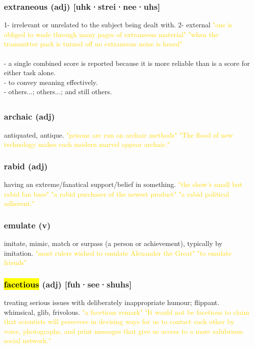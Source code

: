 \documentclass{proc}
\begin{document}
	\subsubsection{\textcolor{brickred}{extraneous} (adj) [uhk·strei·nee·uhs]}
	1- irrelevant or unrelated to the subject being dealt with.
	2- external
	\textcolor{gold}{"one is obliged to wade through many pages of extraneous material" "when the transmitter pack is turned off no extraneous noise is heard"}\\\\
	- a single combined score is reported because it is more reliable than is a score for either task alone.\\
	- to convey meaning effectively.\\
	- others...; others...; and still others.
	
	\newpage
	\subsection{}
	\subsubsection{\textcolor{brickred}{archaic} (adj)}
	antiquated, antique.
	\textcolor{gold}{"prisons are run on archaic methods" "The flood  of  new  technology makes each  modern marvel appear archaic."}
	
	\subsubsection{\textcolor{brickred}{rabid} (adj)}
	having an extreme/fanatical support/belief in something.
	\textcolor{gold}{"the show's small but rabid fan base" "a rabid purchaser of the newest product" "a rabid political adherent."}
	
	\subsubsection{\textcolor{brickred}{emulate} (v)}
	imitate, mimic, match or surpass (a person or achievement), typically by imitation.
	\textcolor{gold}{"most rulers wished to emulate Alexander the Great" "to emulate friends"}
	
	\subsubsection{\textcolor{brickred}{\hl{facetious}} (adj) [fuh·see·shuhs]}
	treating serious issues with deliberately inappropriate humour; flippant. whimsical, glib, frivolous.
	\textcolor{gold}{"a facetious remark" "It would  not  be facetious to  claim  that scientists will persevere in  devising ways for us to contact each other by voice,  photographs, and  print messages that give us access to a more salubrious social network."}
	
\end{document}
